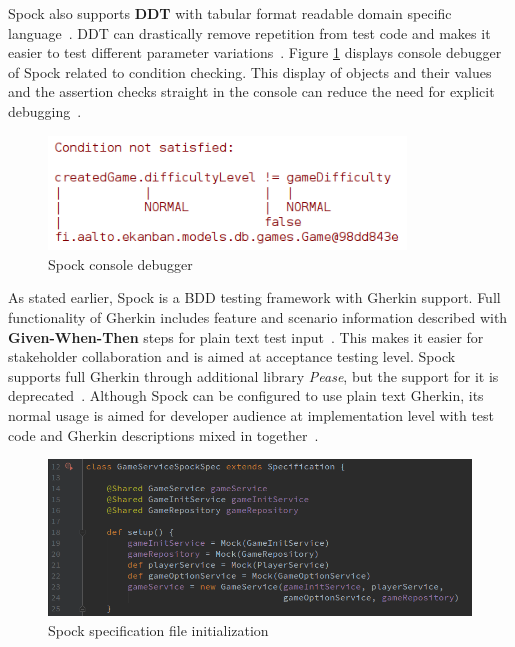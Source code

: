     Spock also supports \textbf{DDT} with tabular format readable
    domain specific language~\cite{spock}.
    DDT can drastically remove repetition from test code and makes it easier to test different parameter
    variations~\cite{kapelonis2016java}.
    Figure \ref{fig:spock-debug} displays console debugger of Spock related to
    condition checking. This display of objects and their values and the assertion checks straight in the console
    can reduce the need for explicit debugging~\cite{kapelonis2016java}.
    \begin{figure}[ht]
      \begin{center}
        \includegraphics[width=9.5cm]{images/spock-debug.png}
        \caption{Spock console debugger}
        \label{fig:spock-debug}
      \end{center}
    \end{figure}

    As stated earlier, Spock is a BDD testing framework with Gherkin support.
    Full functionality of Gherkin includes feature and scenario information described
    with \textbf{Given-When-Then} steps for plain text test input~\cite{gherkin}. This makes it easier for stakeholder collaboration
    and is aimed at acceptance testing level.
    Spock supports full Gherkin through additional library \textit{Pease}, but the support for it is deprecated~\cite{spock-pease}.
    Although Spock can be configured to use plain text Gherkin, its normal usage is aimed for developer audience at implementation
    level with test code and Gherkin descriptions mixed in together~\cite{okolnychyi2016study}.

    \begin{figure}[ht]
      \begin{center}
        \includegraphics[width=13.7cm]{images/spock-init.png}
        \caption{Spock specification file initialization}
        \label{fig:spock-init}
      \end{center}
    \end{figure}

